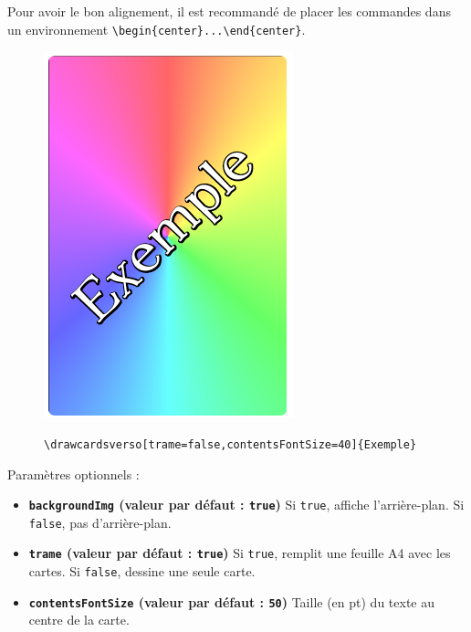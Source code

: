 \documentclass[a4paper, 12pt]{article}
\newcommand{\key}[3]{\textbf{\texttt{#1} (valeur par défaut : \texttt{#2})} #3}
\newcommand{\commande}[1]{\texttt{\textbackslash#1}}
\begin{document}
Pour avoir le bon alignement, il est recommandé de placer les commandes dans un environnement \verb!\begin{center}...\end{center}!.
\begin{figure}[h]\begin{center}
	\caption{\commande{drawcardsverso[trame=false,contentsFontSize=40]\{Exemple\}}}
	\includegraphics{screen02.png}\label{fig:verso}
\end{center}\end{figure}

Paramètres optionnels :
\begin{itemize}
	\item \key{backgroundImg}{true}{Si \texttt{true}, affiche l'arrière-plan. Si \texttt{false}, pas d'arrière-plan.}
	\item \key{trame}{true}{Si \texttt{true}, remplit une feuille A4 avec les cartes. Si \texttt{false}, dessine une seule carte.}
	\item \key{contentsFontSize}{50}{Taille (en pt) du texte au centre de la carte.}
\end{itemize}
\end{document}
